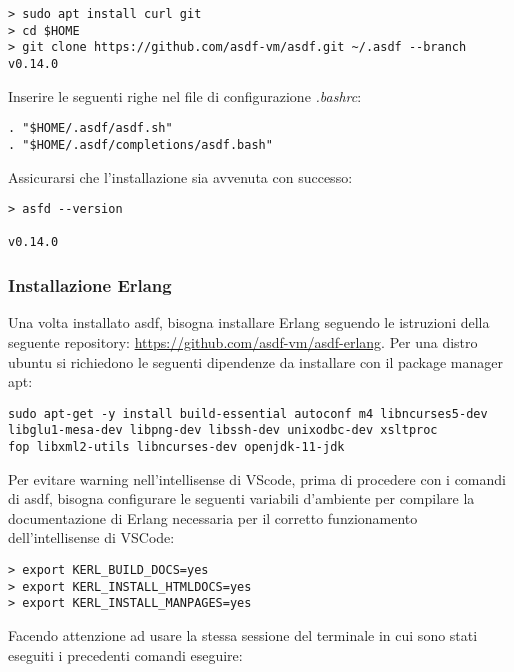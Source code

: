 \begin{lstlisting}[language=none]
> sudo apt install curl git
> cd $HOME
> git clone https://github.com/asdf-vm/asdf.git ~/.asdf --branch v0.14.0
\end{lstlisting}

Inserire le seguenti righe nel file di configurazione \textit{.bashrc}:

\begin{lstlisting}[language=none]
. "$HOME/.asdf/asdf.sh"
. "$HOME/.asdf/completions/asdf.bash"
\end{lstlisting}

Assicurarsi che l'installazione sia avvenuta con successo:

\begin{lstlisting}[language=none]
> asfd --version

v0.14.0
\end{lstlisting}

\subsubsection{Installazione Erlang}

Una volta installato asdf, bisogna installare Erlang
seguendo le istruzioni della seguente repository: \url{https://github.com/asdf-vm/asdf-erlang}.
Per una distro ubuntu si richiedono le seguenti dipendenze da installare con
il package manager apt:
\begin{lstlisting}[language=none]
sudo apt-get -y install build-essential autoconf m4 libncurses5-dev
libglu1-mesa-dev libpng-dev libssh-dev unixodbc-dev xsltproc
fop libxml2-utils libncurses-dev openjdk-11-jdk
\end{lstlisting}

Per evitare warning nell'intellisense di VScode, prima di procedere con i
comandi di asdf, bisogna configurare
le seguenti variabili d'ambiente per compilare la documentazione di Erlang
necessaria per il corretto funzionamento dell'intellisense di VSCode:

\begin{lstlisting}[language=none]
> export KERL_BUILD_DOCS=yes
> export KERL_INSTALL_HTMLDOCS=yes
> export KERL_INSTALL_MANPAGES=yes
\end{lstlisting}

Facendo attenzione ad usare la stessa sessione del terminale in cui sono
stati eseguiti i precedenti comandi eseguire:

